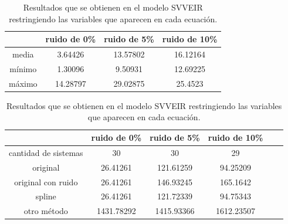 \begin{table}[!h]
    \centering
    \caption{Resultados que se obtienen en el modelo SVVEIR restringiendo las variables que aparecen en cada ecuación.}
    \begin{tabular}{|c|c|c|c|}
        \hline
               & \textbf{ruido de 0\%} & \textbf{ruido de 5\%} & \textbf{ruido de 10\%} \\
        \hline
        media  & 3.64426               & 13.57802              & 16.12164               \\
        \hline
        mínimo & 1.30096               & 9.50931               & 12.69225               \\
        \hline
        máximo & 14.28797              & 29.02875              & 25.4523                \\
        \hline
    \end{tabular}

    \begin{tabular}{|c|c|c|c|c|c|}
        \hline
                             & \textbf{ruido de 0\%} & \textbf{ruido de 5\%} & \textbf{ruido de 10\%} \\
        \hline
        cantidad de sistemas & 30                    & 30                    & 29                     \\
        \hline
        original             & 26.41261              & 121.61259             & 94.25209               \\
        \hline
        original con ruido   & 26.41261              & 146.93245             & 165.1642               \\
        \hline
        spline               & 26.41261              & 121.72339             & 94.75343               \\
        \hline
        otro método          & 1431.78292            & 1415.93366            & 1612.23507             \\
        \hline
    \end{tabular}
    \label{table:experiment_SVVEIR}
\end{table}

